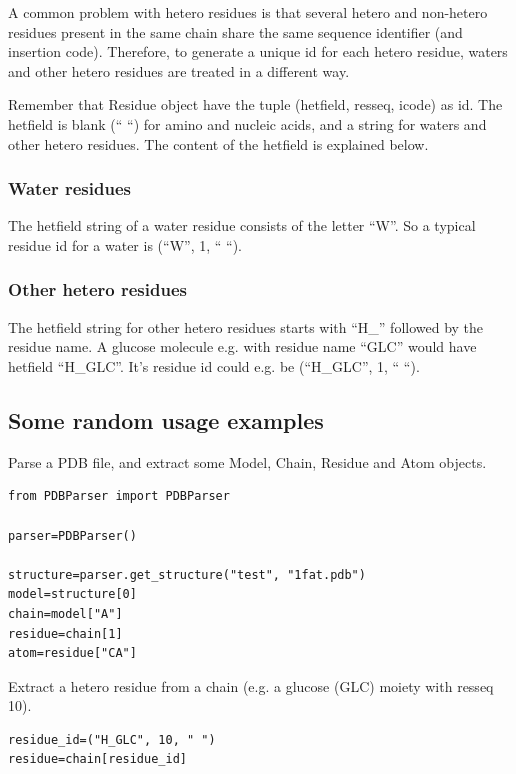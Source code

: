 \documentclass{report}
\begin{document}
A common problem with hetero residues is that several hetero and non-hetero
residues present in the same chain share the same sequence identifier (and insertion
code). Therefore, to generate a unique id for each hetero residue, waters and
other hetero residues are treated in a different way. 

Remember that Residue object have the tuple (hetfield, resseq, icode) as id.
The hetfield is blank ({}`` {}``) for amino and nucleic acids, and a string
for waters and other hetero residues. The content of the hetfield is explained
below.

\subsubsection{Water residues}

The hetfield string of a water residue consists of the letter {}``W{}''. So
a typical residue id for a water is ({}``W{}'', 1, {}`` {}``).

\subsubsection{Other hetero residues}

The hetfield string for other hetero residues starts with {}``H\_{}'' followed
by the residue name. A glucose molecule e.g. with residue name {}``GLC{}''
would have hetfield {}``H\_GLC{}''. It's residue id could e.g. be ({}``H\_GLC{}'',
1, {}`` {}``).

\subsection{Some random usage examples}

Parse a PDB file, and extract some Model, Chain, Residue and Atom objects.

\begin{verbatim}
from PDBParser import PDBParser 

parser=PDBParser()

structure=parser.get_structure("test", "1fat.pdb")
model=structure[0]
chain=model["A"]
residue=chain[1]
atom=residue["CA"]
\end{verbatim}

Extract a hetero residue from a chain (e.g. a glucose (GLC) moiety with resseq
10).

\begin{verbatim}
residue_id=("H_GLC", 10, " ")
residue=chain[residue_id]
\end{verbatim}
\end{document}
